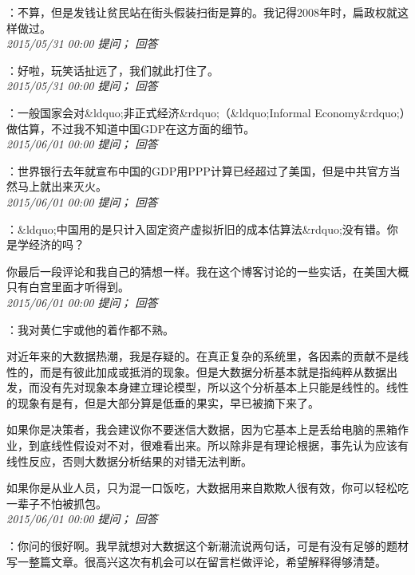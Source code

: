 \documentclass[twocolumn]{ctexart}
\begin{document}
：不算，但是发钱让贫民站在街头假装扫街是算的。我记得2008年时，扁政权就这样做过。\\

\textit{\hfill\noindent\small 2015/05/31 00:00 提问； 回答}

：好啦，玩笑话扯远了，我们就此打住了。\\

\textit{\hfill\noindent\small 2015/05/31 00:00 提问； 回答}

：一般国家会对\&ldquo;非正式经济\&rdquo;（\&ldquo;Informal Economy\&rdquo;）做估算，不过我不知道中国GDP在这方面的细节。\\

\textit{\hfill\noindent\small 2015/06/01 00:00 提问； 回答}

：世界银行去年就宣布中国的GDP用PPP计算已经超过了美国，但是中共官方当然马上就出来灭火。\\

\textit{\hfill\noindent\small 2015/06/01 00:00 提问； 回答}

：\&ldquo;中国用的是只计入固定资产虚拟折旧的成本估算法\&rdquo;没有错。你是学经济的吗？

你最后一段评论和我自己的猜想一样。我在这个博客讨论的一些实话，在美国大概只有白宫里面才听得到。\\

\textit{\hfill\noindent\small 2015/06/01 00:00 提问； 回答}

：我对黄仁宇或他的着作都不熟。

对近年来的大数据热潮，我是存疑的。在真正复杂的系统里，各因素的贡献不是线性的，而是有彼此加成或抵消的现象。但是大数据分析基本就是指纯粹从数据出发，而没有先对现象本身建立理论模型，所以这个分析基本上只能是线性的。线性的现象有是有，但是大部分算是低垂的果实，早已被摘下来了。

如果你是决策者，我会建议你不要迷信大数据，因为它基本上是丢给电脑的黑箱作业，到底线性假设对不对，很难看出来。所以除非是有理论根据，事先认为应该有线性反应，否则大数据分析结果的对错无法判断。

如果你是从业人员，只为混一口饭吃，大数据用来自欺欺人很有效，你可以轻松吃一辈子不怕被抓包。\\

\textit{\hfill\noindent\small 2015/06/01 00:00 提问； 回答}

：你问的很好啊。我早就想对大数据这个新潮流说两句话，可是有没有足够的题材写一整篇文章。很高兴这次有机会可以在留言栏做评论，希望解释得够清楚。
\end{document}
